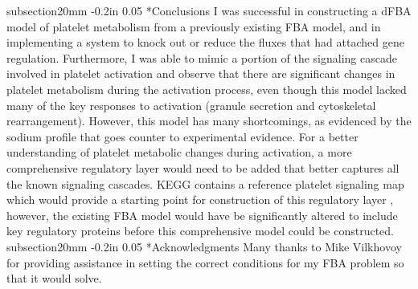\documentclass[11pt]{article}
\makeatletter
\renewcommand\section{\@startsection
	{subsection}{2}{0mm}
	{-0.2in}
	{0.05\baselineskip}
	{\normalfont\large\bfseries}}
\makeatother
\begin{document}
\section*{Conclusions}
I was successful in constructing a dFBA model of platelet metabolism from a previously existing FBA model, and in implementing a system to knock out or reduce the fluxes that had attached gene regulation. Furthermore, I was able to mimic a portion of the signaling cascade involved in platelet activation and observe that there are significant changes in platelet metabolism during the activation process, even though this model lacked many of the key responses to activation (granule secretion and cytoskeletal rearrangement). However, this model has many shortcomings, as evidenced by the sodium profile that goes counter to experimental evidence. For a better understanding of platelet metabolic changes during activation, a more comprehensive regulatory layer would need to be added that better captures all the known signaling cascades. KEGG contains a reference platelet signaling map which would provide a starting point for construction of this regulatory layer \cite{kanehisa2017kegg}, however, the existing FBA model would have be significantly altered to include key regulatory proteins before this comprehensive model could be constructed.
\section*{Acknowledgments}
Many thanks to Mike Vilkhovoy for providing assistance in setting the correct conditions for my FBA problem so that it would solve.



\end{document}
